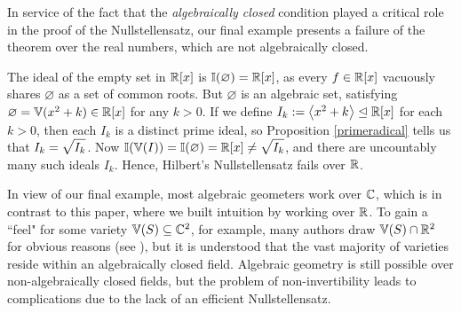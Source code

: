 \documentclass{article}
\newcommand{\V}{\mathbb V}
\newcommand{\I}{\mathbb I}
\begin{document}
In service of the fact that the \textit{algebraically closed} condition played a critical role in the proof of the Nullstellensatz, our final example presents a failure of the theorem over the real numbers, which are not algebraically closed.
\begin{example}
The ideal of the empty set in $\mathbb R[x]$ is $\I(\varnothing) = \R[x]$, as every $f\in \mathbb R[x]$ vacuously shares $\varnothing$ as a set of common roots. But $\varnothing$ is an algebraic set, satisfying $\varnothing = \V(x^2 + k)\in \R[x]$ for any $k > 0$. If we define $I_k := \left\langle x^2+k\right\rangle \trianglelefteq \mathbb R[x]$ for each $k>0$, then each $I_k$ is a distinct prime ideal, so Proposition \ref{primeradical} tells us that $I_k= \displaystyle\sqrt{I_k}$. Now $\I(\V(I)) = \I(\varnothing) = \R[x] \neq \ds\sqrt{I_k}$, and there are uncountably many such ideals $I_k$. Hence, Hilbert's Nullstellensatz fails over $\mathbb R$.
\end{example}


In view of our final example, most algebraic geometers work over $\mathbb C$, which is in contrast to this paper, where we built intuition by working over $\mathbb R$. To gain a ``feel" for some variety $\V(S)\subseteq \C^2$, for example, many authors draw $\V(S) \cap \R^2$ for obvious reasons (see \cite{smith}), but it is understood that the vast majority of varieties reside within an algebraically closed field. Algebraic geometry is still possible over non-algebraically closed fields, but the problem of non-invertibility leads to complications due to the lack of an efficient Nullstellensatz.
\printbibliography
\end{document}
